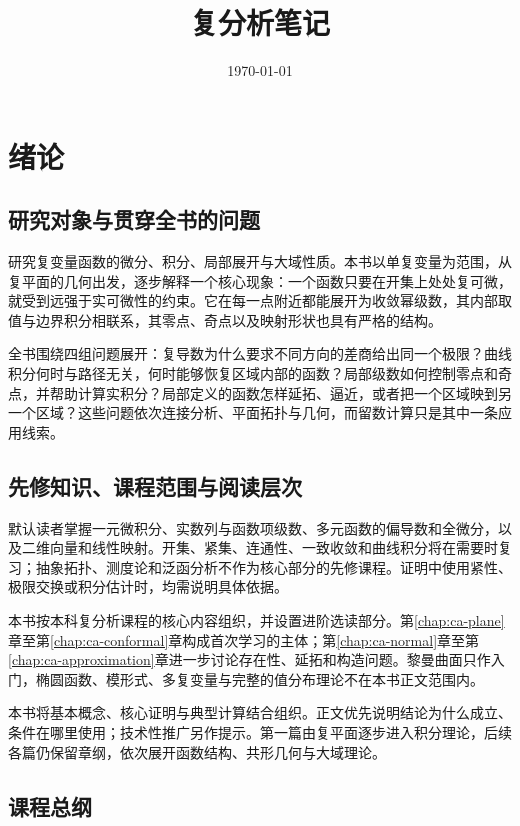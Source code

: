 \documentclass[UTF8,12pt,a4paper,fontset=fandol]{ctexbook}
\title{复分析笔记}
\author{}
\date{\today}
\begin{document}
\maketitle
\tableofcontents
\clearpage


\chapter{绪论}
\label{chap:ca-introduction}

\section{研究对象与贯穿全书的问题}

研究复变量函数的微分、积分、局部展开与大域性质。本书以单复变量为范围，从复平面的几何出发，逐步解释一个核心现象：一个函数只要在开集上处处复可微，就受到远强于实可微性的约束。它在每一点附近都能展开为收敛幂级数，其内部取值与边界积分相联系，其零点、奇点以及映射形状也具有严格的结构。

全书围绕四组问题展开：复导数为什么要求不同方向的差商给出同一个极限？曲线积分何时与路径无关，何时能够恢复区域内部的函数？局部级数如何控制零点和奇点，并帮助计算实积分？局部定义的函数怎样延拓、逼近，或者把一个区域映到另一个区域？这些问题依次连接分析、平面拓扑与几何，而留数计算只是其中一条应用线索。

\section{先修知识、课程范围与阅读层次}

默认读者掌握一元微积分、实数列与函数项级数、多元函数的偏导数和全微分，以及二维向量和线性映射。开集、紧集、连通性、一致收敛和曲线积分将在需要时复习；抽象拓扑、测度论和泛函分析不作为核心部分的先修课程。证明中使用紧性、极限交换或积分估计时，均需说明具体依据。

本书按本科复分析课程的核心内容组织，并设置进阶选读部分。第\ref{chap:ca-plane}章至第\ref{chap:ca-conformal}章构成首次学习的主体；第\ref{chap:ca-normal}章至第\ref{chap:ca-approximation}章进一步讨论存在性、延拓和构造问题。黎曼曲面只作入门，椭圆函数、模形式、多复变量与完整的值分布理论不在本书正文范围内。

本书将基本概念、核心证明与典型计算结合组织。正文优先说明结论为什么成立、条件在哪里使用；技术性推广另作提示。第一篇由复平面逐步进入积分理论，后续各篇仍保留章纲，依次展开函数结构、共形几何与大域理论。

\section{课程总纲}
\end{document}
